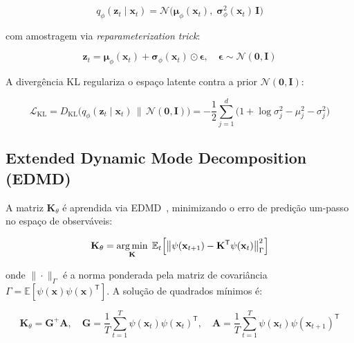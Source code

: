 \begin{equation}
q_\phi(\mathbf{z}_t \mid \mathbf{x}_t) = \mathcal{N}\!\bigl(\boldsymbol{\mu}_\phi(\mathbf{x}_t),\; \boldsymbol{\sigma}_\phi^2(\mathbf{x}_t)\,\mathbf{I}\bigr)
\label{eq:vae_posterior}
\end{equation}

com amostragem via \emph{reparameterization trick}:

\begin{equation}
\mathbf{z}_t = \boldsymbol{\mu}_\phi(\mathbf{x}_t) + \boldsymbol{\sigma}_\phi(\mathbf{x}_t) \odot \boldsymbol{\epsilon}, \quad \boldsymbol{\epsilon} \sim \mathcal{N}(\mathbf{0}, \mathbf{I})
\label{eq:reparam}
\end{equation}

A divergência KL regulariza o espaço latente contra a prior $\mathcal{N}(\mathbf{0}, \mathbf{I})$:

\begin{equation}
\mathcal{L}_{\text{KL}} = D_{\text{KL}}\!\bigl(q_\phi(\mathbf{z}_t \mid \mathbf{x}_t) \,\|\, \mathcal{N}(\mathbf{0}, \mathbf{I})\bigr)
      = -\frac{1}{2} \sum_{j=1}^{d} \bigl(1 + \log \sigma_j^2 - \mu_j^2 - \sigma_j^2\bigr)
\label{eq:kl_div}
\end{equation}

\subsection{Extended Dynamic Mode Decomposition (EDMD)}
\label{sec:edmd}

A matriz $\mathbf{K}_\theta$ é aprendida via EDMD~\cite{article:williams2015}, minimizando o erro de predição um-passo no espaço de observáveis:

\begin{equation}
\mathbf{K}_\theta = \operatorname*{arg\,min}_{\mathbf{K}} \; \mathbb{E}_{t}\Bigl[ \bigl\| \psi(\mathbf{x}_{t+1}) - \mathbf{K}^{\mathsf{T}} \psi(\mathbf{x}_t) \bigr\|_{\Gamma}^2 \Bigr]
\label{eq:edmd_obj}
\end{equation}

onde $\|\cdot\|_{\Gamma}$ é a norma ponderada pela matriz de covariância $\Gamma = \mathbb{E}[\psi(\mathbf{x})\psi(\mathbf{x})^{\mathsf{T}}]$. A solução de quadrados mínimos é:

\begin{equation}
\mathbf{K}_\theta = \mathbf{G}^{+} \mathbf{A}, \quad
\mathbf{G} = \frac{1}{T}\sum_{t=1}^{T} \psi(\mathbf{x}_t)\psi(\mathbf{x}_t)^{\mathsf{T}}, \quad
\mathbf{A} = \frac{1}{T}\sum_{t=1}^{T} \psi(\mathbf{x}_t)\psi(\mathbf{x}_{t+1})^{\mathsf{T}}
\label{eq:edmd_solve}
\end{equation}

